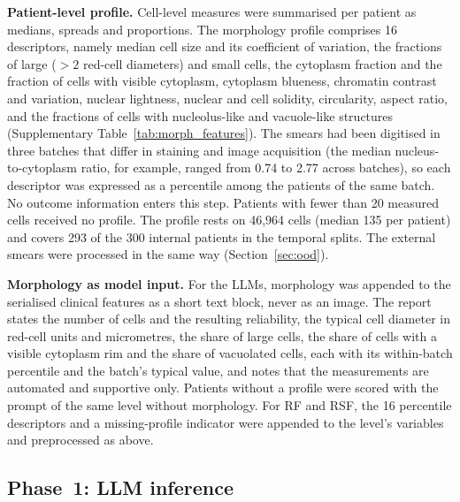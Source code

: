 \documentclass[pdflatex,sn-nature]{sn-jnl}
\begin{document}
\textbf{Patient-level profile.}
Cell-level measures were summarised per patient as medians, spreads
and proportions.
The morphology profile comprises 16 descriptors, namely median cell
size and its coefficient of variation, the fractions of large ($>2$
red-cell diameters) and small cells, the cytoplasm fraction and the
fraction of cells with visible cytoplasm, cytoplasm blueness, chromatin
contrast and variation, nuclear lightness, nuclear and cell solidity,
circularity, aspect ratio, and the fractions of cells with
nucleolus-like and vacuole-like structures (Supplementary
Table~\ref{tab:morph_features}).
The smears had been digitised in three batches that differ in staining
and image acquisition (the median nucleus-to-cytoplasm ratio, for
example, ranged from 0.74 to 2.77 across batches), so each descriptor
was expressed as a percentile among the patients of the same batch.
No outcome information enters this step.
Patients with fewer than 20 measured cells received no profile.
The profile rests on 46,964 cells (median 135 per patient) and covers
293 of the 300 internal patients in the temporal splits.
The external smears were processed in the same way
(Section~\ref{sec:ood}).

\textbf{Morphology as model input.}
For the LLMs, morphology was appended to the serialised clinical
features as a short text block, never as an image.
The report states the number of cells and the resulting reliability,
the typical cell diameter in red-cell units and micrometres, the share
of large cells, the share of cells with a visible cytoplasm rim and
the share of vacuolated cells, each with its within-batch percentile
and the batch's typical value, and notes that the measurements are
automated and supportive only.
Patients without a profile were scored with the prompt of the same
level without morphology.
For RF and RSF, the 16 percentile descriptors and a missing-profile
indicator were appended to the level's variables and preprocessed as
above.

\subsection{Phase~1: LLM inference}\label{sec:llm_inference}
\end{document}

